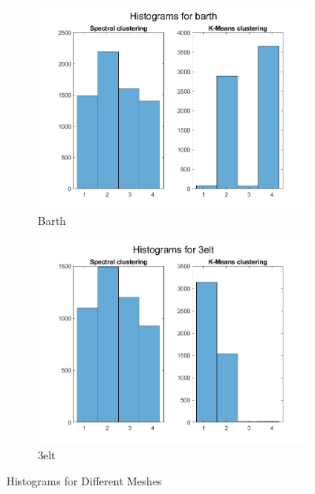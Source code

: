 \documentclass[unicode,11pt,a4paper,oneside,numbers=endperiod,openany]{scrartcl}
\begin{document}
\begin{figure}[H]
    \begin{subfigure}{0.45\textwidth}
        \centering
        \includegraphics[width=\linewidth]{figures/2.3_barth.png}
        \caption{Barth}
        \label{fig:barth-2.3}
    \end{subfigure}
    \hfill
    \begin{subfigure}{0.45\textwidth}
        \centering
        \includegraphics[width=\linewidth]{figures/2.3_3elt.png}
        \caption{3elt}
        \label{fig:3elt-2.3}
    \end{subfigure}
    \caption{Histograms for Different Meshes}
    \label{fig:overall-2.3}
\end{figure}
\end{document}
